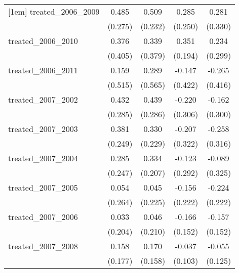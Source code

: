 {\begin{tabular}{l*{4}{c}}
[1em]
treated\_2006\_2009&       0.485         &       0.509\sym{*}  &       0.285         &       0.281         \\
            &     (0.275)         &     (0.232)         &     (0.250)         &     (0.330)         \\
[1em]
treated\_2006\_2010&       0.376         &       0.339         &       0.351         &       0.234         \\
            &     (0.405)         &     (0.379)         &     (0.194)         &     (0.299)         \\
[1em]
treated\_2006\_2011&       0.159         &       0.289         &      -0.147         &      -0.265         \\
            &     (0.515)         &     (0.565)         &     (0.422)         &     (0.416)         \\
[1em]
treated\_2007\_2002&       0.432         &       0.439         &      -0.220         &      -0.162         \\
            &     (0.285)         &     (0.286)         &     (0.306)         &     (0.300)         \\
[1em]
treated\_2007\_2003&       0.381         &       0.330         &      -0.207         &      -0.258         \\
            &     (0.249)         &     (0.229)         &     (0.322)         &     (0.316)         \\
[1em]
treated\_2007\_2004&       0.285         &       0.334         &      -0.123         &      -0.089         \\
            &     (0.247)         &     (0.207)         &     (0.292)         &     (0.325)         \\
[1em]
treated\_2007\_2005&       0.054         &       0.045         &      -0.156         &      -0.224         \\
            &     (0.264)         &     (0.225)         &     (0.222)         &     (0.222)         \\
[1em]
treated\_2007\_2006&       0.033         &       0.046         &      -0.166         &      -0.157         \\
            &     (0.204)         &     (0.210)         &     (0.152)         &     (0.152)         \\
[1em]
treated\_2007\_2008&       0.158         &       0.170         &      -0.037         &      -0.055         \\
            &     (0.177)         &     (0.158)         &     (0.103)         &     (0.125)         \\

\end{tabular}}

